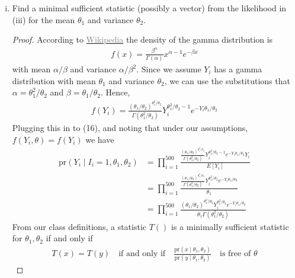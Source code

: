\documentclass[letterpaper, 12pt]{article}
\newcommand{\hrefcolor}[3]{\href{#1}{\textcolor{#3}{#2}}}
\newcommand{\hrefgray}[2]{\hrefcolor{#1}{#2}{Gray}}
\newcommand{\pr}{\text{pr}}
\newcommand{\sbs}{\;|\;} %
\begin{document}
\begin{enumerate}[(i)]
\item
Find a minimal sufficient statistic (possibly a vector) from the likelihood in (iii) for the mean $\theta_1$ and variance $\theta_2$.
\begin{proof}
According to 
\hrefgray
{http://en.wikipedia.org/wiki/Gamma_distribution}
{Wikipedia}
the density of the gamma distribution is
\begin{align}
f(x) = \frac{\beta^\alpha}{\Gamma(\alpha)} x^{\alpha - 1}e^{-\beta x}
\end{align}
with mean $\alpha / \beta$ and variance $\alpha / \beta^2$. Since we assume $Y_i$ has a gamma distribution with mean $\theta_1$ and variance $\theta_2$, we can use the substitutions that $\alpha = \theta_1^2 / \theta_2$ and $\beta = \theta_1 / \theta_2$.
Hence, 
\begin{align}
f(Y_i) = \frac{(\theta_1 / \theta_2)^{\theta_1^2 / \theta_2}}{\Gamma(\theta_1^2 / \theta_2)} Y_i^{\theta_1^2 / \theta_2 - 1}e^{-Y_i \theta_1/\theta_2}
\end{align}
Plugging this in to (16), and noting that under our assumptions, $f(Y_i, \theta) = f(Y_i)$ we have
\begin{align}
\pr(Y_i \sbs I_i = 1, \theta_1, \theta_2) 
&= \prod_{i=1}^{500} 
\frac{\frac{(\theta_1 / \theta_2)^{\theta_1^2 / \theta_2}}{\Gamma(\theta_1^2 / \theta_2)} Y_i^{\theta_1^2 / \theta_2 - 1}e^{-Y_i \theta_1/\theta_2} Y_i}
{E[Y_i]} \\
&= \prod_{i=1}^{500} 
\frac{\frac{(\theta_1 / \theta_2)^{\theta_1^2 / \theta_2}}{\Gamma(\theta_1^2 / \theta_2)} Y_i^{\theta_1^2 / \theta_2}e^{-Y_i \theta_1/\theta_2}}
{\theta_1} \\
&= \prod_{i=1}^{500} 
\frac{(\theta_1 / \theta_2)^{\theta_1^2 / \theta_2} Y_i^{\theta_1^2 / \theta_2}e^{-Y_i \theta_1/\theta_2}}
{\theta_1 \Gamma(\theta_1^2 / \theta_2)}
\end{align} 
From our class definitions, a statistic $T()$ is a minimally sufficient statistic for $\theta_1, \theta_2$ if and only if
\begin{align}
T(x) = T(y) \quad \text{if and only if} \quad \frac{\pr(x \sbs \theta_1, \theta_2)}{\pr(y \sbs \theta_1, \theta_2)} \quad \text{is free of $\theta$}
\end{align}

\end{proof}
\end{enumerate}
\end{document}
